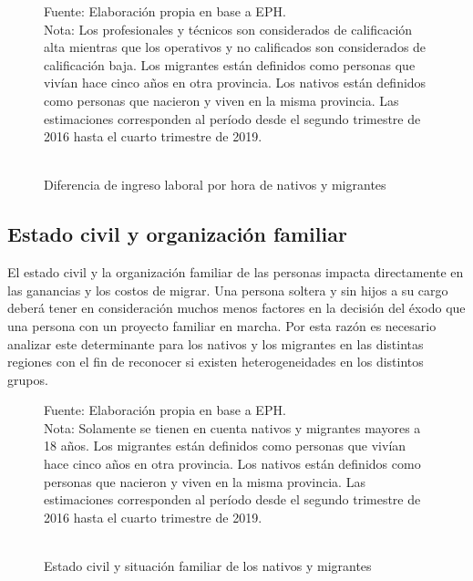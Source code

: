 \documentclass[12pt,a4paper]{article}
\begin{document}
\begin{figure}[!htbp]
\begin{center}
\caption{\\Diferencia de ingreso laboral por hora de nativos y migrantes}
\label{figure:prima_sal}
 

  
\end{center}
\begin{flushleft}
\begin{scriptsize}
Fuente: Elaboración propia en base a EPH.\\
Nota: Los profesionales y técnicos son considerados de calificación alta mientras que los operativos y no calificados son considerados de calificación baja. Los migrantes están definidos como personas que vivían hace cinco años en otra provincia. Los nativos están definidos como personas que nacieron y viven en la misma provincia. Las estimaciones corresponden al período desde el segundo trimestre de 2016 hasta el cuarto trimestre de 2019.\\
\end{scriptsize}
\end{flushleft}
\end{figure}

\newpage
\subsection{Estado civil y organización familiar}

El estado civil y la organización familiar de las personas impacta directamente en las ganancias y los costos de migrar. Una persona soltera y sin hijos a su cargo deberá tener en consideración muchos menos factores en la decisión del éxodo que una persona con un proyecto familiar en marcha. Por esta razón es necesario analizar este determinante para los nativos y los migrantes en las distintas regiones con el fin de reconocer si existen heterogeneidades en los distintos grupos.

\begin{figure}[htbp!]
\begin{center}
\caption{\\Estado civil y situación familiar de los nativos y migrantes}
\label{figure:estadociv_mig}
 
\end{center}
\begin{flushleft}
\begin{scriptsize}
Fuente: Elaboración propia en base a EPH.\\
Nota: Solamente se tienen en cuenta nativos y migrantes mayores a 18 años. Los migrantes están definidos como personas que vivían hace cinco años en otra provincia. Los nativos están definidos como personas que nacieron y viven en la misma provincia. Las estimaciones corresponden al período desde el segundo trimestre de 2016 hasta el cuarto trimestre de 2019.\\
\end{scriptsize}
\end{flushleft}
\end{figure}
\end{document}
